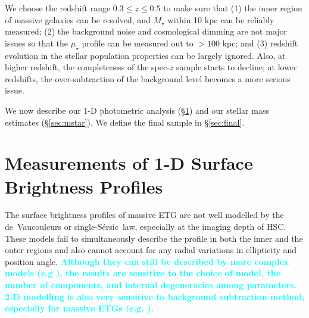 \documentclass[fleqn,usenatbib]{mnras}
\def\ser{{S\'{e}rsic\ }}
\def\mstar{{$M_{\star}$}}
\def\mden{{$\mu_{\star}$}}
\newcommand{\song}[1]{\textcolor{cyan}{\textbf{#1}}}
\begin{document}
    We choose the redshift range $0.3 \leq z \leq 0.5$ to make sure that  
    (1) the inner region of massive galaxies can be resolved, and \mstar{} within 
    10 kpc can be reliably measured; 
    (2) the background noise and cosmological dimming are not major issues so that 
    the \mden{} profile can be measured out to $>100$ kpc; and
    (3) redshift evolution in the stellar population properties can be largely 
    ignored.  
    Also, at higher redshift, the completeness of the spec-$z$ sample starts to 
    decline; at lower redshifts, the over-subtraction of the background level 
    becomes a more serious issue.  
   
    We now describe our 1-D photometric analysis 
    (\S \ref{sec:ellipse}) and our stellar mass estimates (\S \ref{sec:mstar}). 
    We define the final sample in \S \ref{sec:final}.

\section{Measurements of 1-D Surface Brightness Profiles}
    \label{sec:ellipse}
    
    The surface brightness profiles of massive ETG are not well modelled by the 
    de~Vaucouleurs or single-\ser law, especially at the imaging depth of HSC.
    These models fail to simultaneously describe the profile in both the inner 
    and the outer regions and also cannot account for any radial variations in 
    ellipticity and position angle. 
    \song{
    Although they can still be described by more complex models 
    (e.g \citealt{Huang2013a, Huang2013b, Oh2017}), the results are 
    sensitive to the choice of model, the number of components, and internal 
    degeneracies among parameters. 
    2-D modelling is also very sensitive to background subtraction method, 
    especially for massive ETGs (e.g. \citealt{Huang2013a}).
    }
    
\end{document}
